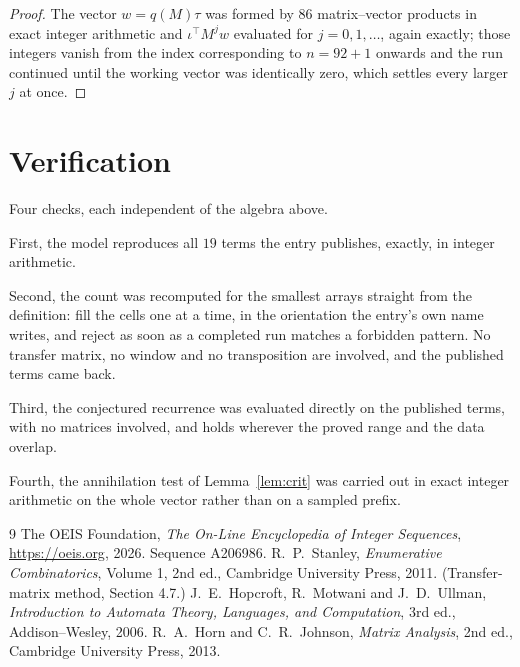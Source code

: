 \documentclass[11pt,a4paper]{article}
\theoremstyle{plain}
\theoremstyle{definition}
\begin{document}
\begin{proof}
The vector $w=q(M)\tau$ was formed by $86$ matrix--vector products in exact integer
arithmetic and $\iota^{\!\top}M^{j}w$ evaluated for $j=0,1,\dots$, again exactly; those
integers vanish from the index corresponding to $n=92+1$ onwards and the run continued
until the working vector was identically zero, which settles every larger $j$ at once.
\end{proof}

\section{Verification}

Four checks, each independent of the algebra above.

First, the model reproduces all $19$ terms the entry publishes, exactly, in integer
arithmetic.

Second, the count was recomputed for the smallest arrays straight from the definition: fill the
cells one at a time, in the orientation the entry's own name writes, and reject as soon as a
completed run matches a forbidden pattern. No transfer matrix, no window and no transposition
are involved, and the published terms came back.

Third, the conjectured recurrence was evaluated directly on the published terms, with no
matrices involved, and holds wherever the proved range and the data overlap.

Fourth, the annihilation test of Lemma~\ref{lem:crit} was carried out in exact integer
arithmetic on the whole vector rather than on a sampled prefix.

\begin{thebibliography}{9}
 The OEIS Foundation, \emph{The On-Line Encyclopedia of Integer
Sequences}, \url{https://oeis.org}, 2026. Sequence A206986.
 R.~P.~Stanley, \emph{Enumerative Combinatorics}, Volume 1, 2nd ed.,
Cambridge University Press, 2011. (Transfer-matrix method, Section 4.7.)
 J.~E.~Hopcroft, R.~Motwani and J.~D.~Ullman, \emph{Introduction to Automata
Theory, Languages, and Computation}, 3rd ed., Addison--Wesley, 2006.
 R.~A.~Horn and C.~R.~Johnson, \emph{Matrix Analysis}, 2nd ed., Cambridge
University Press, 2013.
\end{thebibliography}
\end{document}
